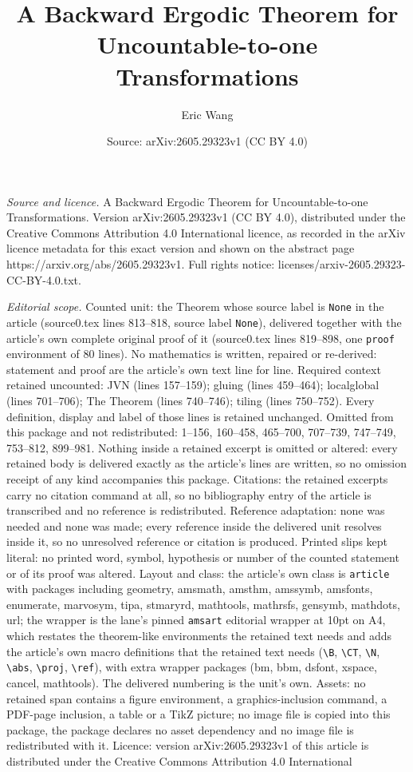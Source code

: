 \documentclass[10pt,a4paper]{amsart}
\title[A Backward Ergodic Theorem for Uncountable-to-one Transforma]{A Backward Ergodic Theorem for Uncountable-to-one Transformations}
\author{Eric Wang}
\date{Source: arXiv:2605.29323v1 (CC BY 4.0)}
\begin{document}
\maketitle

\noindent\emph{Source and licence.} A Backward Ergodic Theorem for Uncountable-to-one Transformations. Version arXiv:2605.29323v1 (CC BY 4.0), distributed under the Creative Commons Attribution 4.0 International licence, as recorded in the arXiv licence metadata for this exact version and shown on the abstract page https://arxiv.org/abs/2605.29323v1. Full rights notice: licenses/arxiv-2605.29323-CC-BY-4.0.txt.\par\smallskip

\noindent\textit{Editorial scope.} Counted unit: the Theorem whose source label is \texttt{None} in the article (source0.tex lines 813--818, source label \texttt{None}), delivered together with the article's own complete original proof of it (source0.tex lines 819--898, one \texttt{proof} environment of 80 lines). No mathematics is written, repaired or re-derived: statement and proof are the article's own text line for line. Required context retained uncounted: JVN (lines 157--159); gluing (lines 459--464); localglobal (lines 701--706); The Theorem (lines 740--746); tiling (lines 750--752). Every definition, display and label of those lines is retained unchanged. Omitted from this package and not redistributed: 1--156, 160--458, 465--700, 707--739, 747--749, 753--812, 899--981. Nothing inside a retained excerpt is omitted or altered: every retained body is delivered exactly as the article's lines are written, so no omission receipt of any kind accompanies this package. Citations: the retained excerpts carry no citation command at all, so no bibliography entry of the article is transcribed and no reference is redistributed. Reference adaptation: none was needed and none was made; every reference inside the delivered unit resolves inside it, so no unresolved reference or citation is produced. Printed slips kept literal: no printed word, symbol, hypothesis or number of the counted statement or of its proof was altered. Layout and class: the article's own class is \texttt{article} with packages including geometry, amsmath, amsthm, amssymb, amsfonts, enumerate, marvosym, tipa, stmaryrd, mathtools, mathrsfs, gensymb, mathdots, url; the wrapper is the lane's pinned \texttt{amsart} editorial wrapper at 10pt on A4, which restates the theorem-like environments the retained text needs and adds the article's own macro definitions that the retained text needs (\texttt{\textbackslash B}, \texttt{\textbackslash CT}, \texttt{\textbackslash N}, \texttt{\textbackslash abs}, \texttt{\textbackslash proj}, \texttt{\textbackslash ref}), with extra wrapper packages (bm, bbm, dsfont, xspace, cancel, mathtools). The delivered numbering is the unit's own. Assets: no retained span contains a figure environment, a graphics-inclusion command, a PDF-page inclusion, a table or a TikZ picture; no image file is copied into this package, the package declares no asset dependency and no image file is redistributed with it. Licence: version arXiv:2605.29323v1 of this article is distributed under the Creative Commons Attribution 4.0 International 
\end{document}
